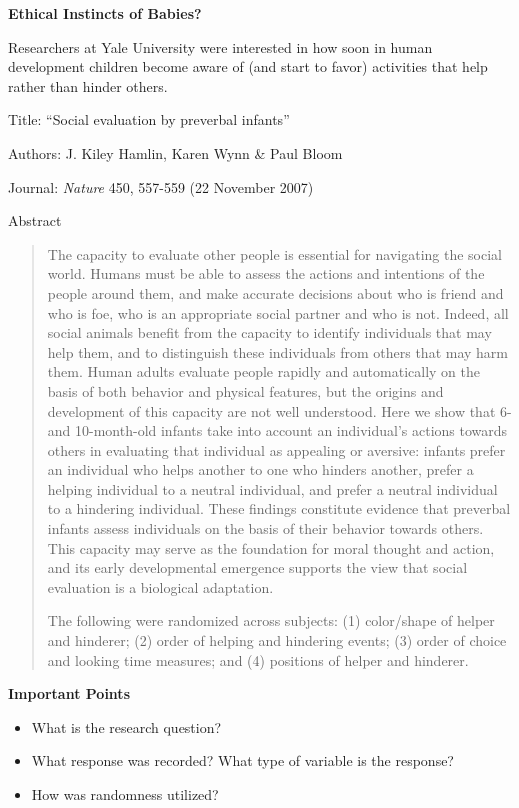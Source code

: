 \def\theTopic{Reading 3}

\begin{center}
{\bf {\large Ethical Instincts of Babies?}}
\end{center}

Researchers at Yale University were interested in how soon in human
development children become aware of (and start to favor) activities
that help rather than hinder others.


Title: ``Social evaluation by preverbal infants''

Authors: J. Kiley Hamlin, Karen Wynn \& Paul Bloom

Journal: {\it Nature} 450, 557-559 (22 November 2007) 

Abstract

\begin{quotation}
  The capacity to evaluate other people is essential for navigating the
social world. Humans must be able to assess the actions and intentions
of the people around them, and make accurate decisions about who is
friend and who is foe, who is an appropriate social partner and who is
not. Indeed, all social animals benefit from the capacity to identify
individuals  that may help them, and to distinguish these
individuals from others that may harm them. Human adults evaluate
people rapidly and automatically on the basis of both behavior and
physical features, but the origins and
development of this capacity are not well understood. Here we show
that 6- and 10-month-old infants take into account an individual's
actions towards others in evaluating that individual as appealing or
aversive: infants prefer an individual who helps another to one who
hinders another, prefer a helping individual to a neutral individual,
and prefer a neutral individual to a hindering individual. These
findings constitute evidence that preverbal infants assess individuals
on the basis of their behavior towards others. This capacity may
serve as the foundation for moral thought and action, and its early
developmental emergence supports the view that social evaluation is a
biological adaptation. 



The following were randomized across subjects:
(1) color/shape of helper and hinderer; (2) order of helping and
hindering events; (3) order of choice and looking time
measures; and (4) positions of helper and hinderer. 
\end{quotation}

\newpage

 \begin{center}
   {\large\bf Important Points}
 \end{center}
 \begin{itemize}
 \item What is the research question?\vspace{1in}
 \item What response was recorded? What type of variable is the
   response? \vspace{1in}
 \item How was randomness utilized?\vspace{1in}

 \end{itemize}




